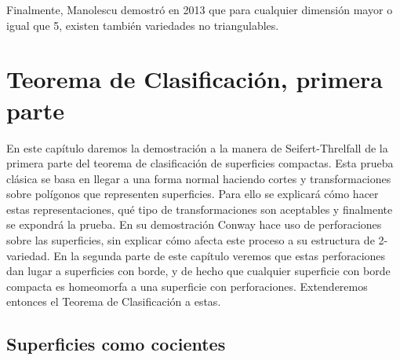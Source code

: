 \documentclass[10pt]{report}
\theoremstyle{definition}
\newcommand\blankpage{%
    \null
    \thispagestyle{empty}%
    \newpage}
\begin{document}
Finalmente, Manolescu \cite{manolescu} demostró en 2013 que para cualquier dimensión mayor o igual que 5, existen también variedades no triangulables.


\clearpage
\afterpage{\blankpage}

\chapter{Teorema de Clasificación, primera parte}
En este capítulo daremos la demostración a la manera de Seifert-Threlfall de la primera parte del teorema de clasificación de superficies compactas. Esta prueba clásica se basa en llegar a una forma normal haciendo cortes y transformaciones sobre polígonos que representen superficies. Para ello se explicará cómo hacer estas representaciones, qué tipo de transformaciones son aceptables y finalmente se expondrá la prueba. 
En su demostración Conway hace uso de perforaciones sobre las superficies, sin explicar cómo afecta este proceso a su estructura de 2-variedad. En la segunda parte de este capítulo veremos que estas perforaciones dan lugar a superficies con borde, y de hecho que cualquier superficie con borde compacta es homeomorfa a una superficie con perforaciones. Extenderemos entonces el Teorema de Clasificación a estas. %


\section{Superficies como cocientes}
\end{document}
